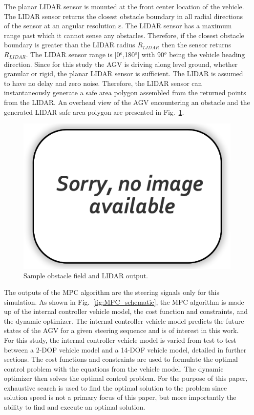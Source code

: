 \documentclass[12pt,twocolumn]{article}
\begin{document}
The planar LIDAR sensor is mounted at the front center location of the vehicle. The LIDAR sensor returns the closest obstacle boundary in all radial directions of the sensor at an angular resolution ε. The LIDAR sensor has a maximum range past which it cannot sense any obstacles. Therefore, if the closest obstacle boundary is greater than the LIDAR radius $R_{LIDAR}$ then the sensor returns $R_{LIDAR}$. The LIDAR sensor range is [0$^o$,180$^o$] with 90$^o$ being the vehicle heading direction. Since for this study the AGV is driving along level ground, whether granular or rigid, the planar LIDAR sensor is sufficient. The LIDAR is assumed to have no delay and zero noise. Therefore, the LIDAR sensor can instantaneously generate a safe area polygon assembled from the returned points from the LIDAR. An overhead view of the AGV encountering an obstacle and the generated LIDAR safe area polygon are presented in Fig.~\ref{fig:obstacle_field}. 
%
\begin{figure}
	\centering
	\includegraphics[width=\columnwidth]{Figs/no-image.png}
	\caption{\small Sample obstacle field and LIDAR output.}    
	\label{fig:obstacle_field}
\end{figure}
	
The outputs of the MPC algorithm are the steering signals only for this simulation. As shown in Fig.~\ref{fig:MPC_schematic}, the MPC algorithm is made up of the internal controller vehicle model, the cost function and constraints, and the dynamic optimizer. The internal controller vehicle model predicts the future states of the AGV for a given steering sequence and is of interest in this work. For this study, the internal controller vehicle model is varied from test to test between a 2-DOF vehicle model and a 14-DOF vehicle model, detailed in further sections. The cost functions and constraints are used to formulate the optimal control problem with the equations from the vehicle model. The dynamic optimizer then solves the optimal control problem. For the purpose of this paper, exhaustive search is used to find the optimal solution to the problem since solution speed is not a primary focus of this paper, but more importantly the ability to find and execute an optimal solution.
\end{document}
